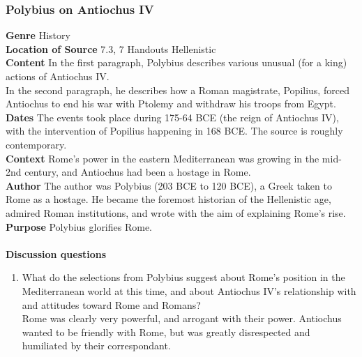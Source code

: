 \documentclass{article}
\begin{document}
\subsubsection*{Polybius on Antiochus IV}
\textbf{Genre}
History \\
\textbf{Location of Source}
7.3, 7 Handouts Hellenistic \\
\textbf{Content}
In the first paragraph, Polybius describes various unusual (for a king) actions of Antiochus IV. \\
In the second paragraph, he describes how a Roman magistrate, Popilius, forced Antiochus
to end his war with Ptolemy and withdraw his troops from Egypt. \\
\textbf{Dates}
The events took place during 175-64 BCE (the reign of Antiochus IV), with the intervention
of Popilius happening in 168 BCE. The source is roughly contemporary.  \\
\textbf{Context}
Rome’s power in the eastern Mediterranean was growing in the mid-2nd century, and
Antiochus had been a hostage in Rome. \\
\textbf{Author}
The author was Polybius (203 BCE to 120 BCE), a Greek taken to Rome as a hostage.
He became the foremost historian of the Hellenistic age, admired Roman institutions, and
wrote with the aim of explaining Rome’s rise. \\
\textbf{Purpose}
Polybius glorifies Rome. \\
\\
\textbf{Discussion questions}
\begin{enumerate}
  \item What do the selections from Polybius suggest about Rome’s position in the
  Mediterranean world at this time, and about Antiochus IV’s relationship with and attitudes
  toward Rome and Romans? \\
  Rome was clearly very powerful, and arrogant with their power. Antiochus wanted to be friendly
  with Rome, but was greatly disrespected and humiliated by their correspondant.
\end{enumerate}
\end{document}
